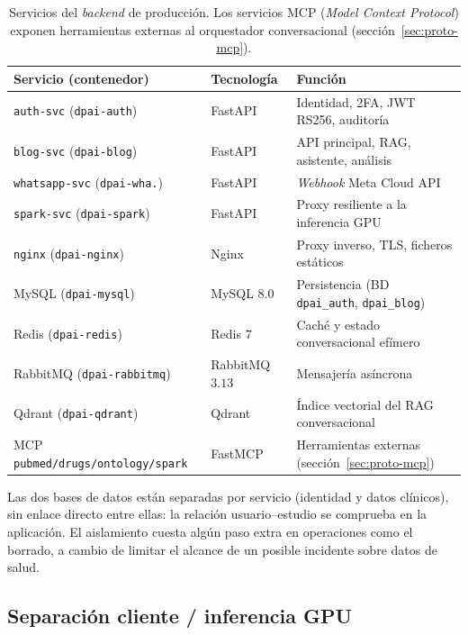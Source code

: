 \begin{table}[htbp]
\centering
\footnotesize
\setlength{\tabcolsep}{4pt}
\renewcommand{\arraystretch}{0.98}
\caption{Servicios del \emph{backend} de producción. Los servicios MCP
(\emph{Model Context Protocol}) exponen herramientas externas al
orquestador conversacional (sección~\ref{sec:proto-mcp}).}
\label{tab:proto-services}
\begin{tabular}{lll}
\hline
Servicio (contenedor) & Tecnología & Función \\
\hline
\texttt{auth-svc} (\texttt{dpai-auth})    & FastAPI       & Identidad, 2FA, JWT RS256, auditoría \\
\texttt{blog-svc} (\texttt{dpai-blog})    & FastAPI       & API principal, RAG, asistente, análisis \\
\texttt{whatsapp-svc} (\texttt{dpai-wha.})& FastAPI       & \emph{Webhook} Meta Cloud API \\
\texttt{spark-svc} (\texttt{dpai-spark})  & FastAPI       & Proxy resiliente a la inferencia GPU \\
\texttt{nginx} (\texttt{dpai-nginx})      & Nginx         & Proxy inverso, TLS, ficheros estáticos \\
MySQL (\texttt{dpai-mysql})               & MySQL $8.0$   & Persistencia (BD \texttt{dpai\_auth}, \texttt{dpai\_blog}) \\
Redis (\texttt{dpai-redis})               & Redis $7$     & Caché y estado conversacional efímero \\
RabbitMQ (\texttt{dpai-rabbitmq})         & RabbitMQ $3.13$& Mensajería asíncrona \\
Qdrant (\texttt{dpai-qdrant})             & Qdrant        & Índice vectorial del RAG conversacional \\
MCP \texttt{pubmed/drugs/ontology/spark}  & FastMCP       & Herramientas externas (sección~\ref{sec:proto-mcp}) \\
\hline
\end{tabular}
\end{table}

Las dos bases de datos están separadas por servicio (identidad y datos
clínicos), sin enlace directo entre ellas: la relación usuario--estudio se
comprueba en la aplicación. El aislamiento cuesta algún paso extra en
operaciones como el borrado, a cambio de limitar el alcance de un posible
incidente sobre datos de salud.

\subsection{Separación cliente / inferencia GPU}
\label{sec:proto-spark}

